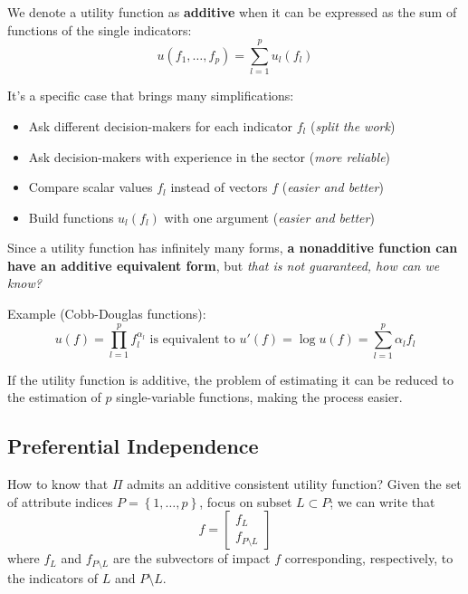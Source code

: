\begin{definition}
	We denote a utility function as \textbf{additive} when it can be expressed as the sum of functions of the single indicators:
	$$ u(f_1, \dots, f_p) = \sum_{l = 1}^p u_l (f_l) $$
\end{definition}

It's a specific case that brings many simplifications:
\begin{itemize}
	\item Ask different decision-makers for each indicator $f_l$ (\textit{split the work})
	
	\item Ask decision-makers with experience in the sector (\textit{more reliable})
	
	\item Compare scalar values $f_l$ instead of vectors $f$ (\textit{easier and better})
	
	\item Build functions $u_l (f_l)$ with one argument (\textit{easier and better})
\end{itemize}

Since a utility function has infinitely many forms, \textbf{a nonadditive function can have an additive equivalent form}, but \textit{that is not guaranteed, how can we know?}

Example (Cobb-Douglas functions):
$$ u(f) = \prod_{l=1}^{p} f_l^{\alpha_l} \text{ is equivalent to } u'(f) = \log u (f) = \sum_{l = 1}^p \alpha_l f_l $$

If the utility function is additive, the problem of estimating it can be reduced to the estimation of $p$ single-variable functions, making the process easier.

\subsection{Preferential Independence}
\label{subsec:preferentialindependence}

How to know that $\Pi$ admits an additive consistent utility function? Given the set of attribute indices $P = \left\{1, \dots, p\right\}$, focus on subset $L \subset P$; we can write that
$$ f = \left[
\begin{array}{c}
	f_L \\
	f_{P\setminus L}
\end{array}
\right]$$
where $f_L$ and $f_{P\setminus L}$ are the subvectors of impact $f$ corresponding, respectively, to the indicators of $L$ and $P \setminus L$.\\

